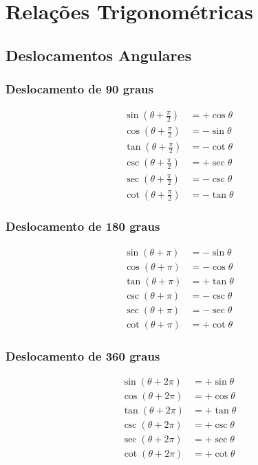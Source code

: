 
\chapter{Relações Trigonométricas}

\section{Deslocamentos Angulares}
\subsection{Deslocamento de 90 graus}
\begin{eqnarray}
\sin(\theta + \tfrac{\pi}{2}) &= +\cos \theta \\
\cos(\theta + \tfrac{\pi}{2}) &= -\sin \theta \\
\tan(\theta + \tfrac{\pi}{2}) &= -\cot \theta \\
\csc(\theta + \tfrac{\pi}{2}) &= +\sec \theta \\
\sec(\theta + \tfrac{\pi}{2}) &= -\csc \theta \\
\cot(\theta + \tfrac{\pi}{2}) &= -\tan \theta
\end{eqnarray}

\subsection{Deslocamento de 180 graus}
\begin{eqnarray}
\sin(\theta + \pi) &= -\sin \theta \\
\cos(\theta + \pi) &= -\cos \theta \\
\tan(\theta + \pi) &= +\tan \theta \\
\csc(\theta + \pi) &= -\csc \theta \\
\sec(\theta + \pi) &= -\sec \theta \\
\cot(\theta + \pi) &= +\cot \theta 
\end{eqnarray}

\subsection{Deslocamento de 360 graus}
\begin{eqnarray}
\sin(\theta + 2\pi) &= +\sin \theta \\
\cos(\theta + 2\pi) &= +\cos \theta \\
\tan(\theta + 2\pi) &= +\tan \theta \\
\csc(\theta + 2\pi) &= +\csc \theta \\
\sec(\theta + 2\pi) &= +\sec \theta \\
\cot(\theta + 2\pi) &= +\cot \theta
\end{eqnarray}




